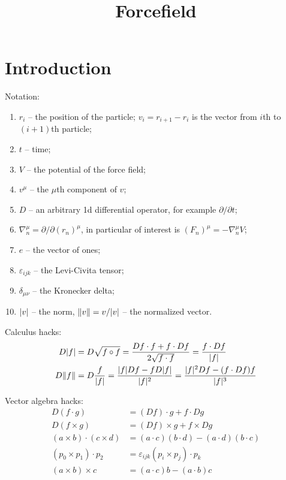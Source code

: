 \documentclass{article}
\title{Forcefield}
\author{}
\date{}
\DeclarePairedDelimiter{\norm}{\lvert}{\rvert}
\DeclarePairedDelimiter{\normed}{\lVert}{\rVert}
\newcommand{\cross}{\times}
\begin{document}
  \maketitle

  \section*{Introduction}
  Notation:
  \begin{enumerate}
    \item $r_i$ -- the position of the particle; $v_i = r_{i+1} - r_i$ is the vector from $i$th to $(i+1)$th particle;
    \item $t$ -- time;
    \item $V$ -- the potential of the force field;
    \item $v^\mu$ -- the $\mu$th component of $v$;
    \item $D$ -- an arbitrary 1d differential operator, for example $\partial/\partial t$;
    \item $\nabla_n^\mu = \partial/\partial (r_n)^\mu$, in particular of interest is $(F_n)^\mu = -\nabla_n^\mu V$;
    \item $e$ -- the vector of ones;
    \item $\varepsilon_{ijk}$ -- the Levi-Civita tensor;
    \item $\delta_{\mu\nu}$ -- the Kronecker delta;
    \item $\norm{v}$ -- the norm, $\normed{v} = v/\norm{v}$ -- the normalized vector.
  \end{enumerate}

  Calculus hacks:
  \begin{align*}
    D\norm{f} &= D\sqrt{f \circ f} = \frac{Df \cdot f + f \cdot Df}{2\sqrt{f \cdot f}} = \frac{f \cdot Df}{\norm{f}}\\
    D\normed{f} &= D\frac{f}{\norm{f}} = \frac{\norm{f}Df-f D\norm{f}}{\norm{f}^2} = \frac{\norm{f}^2 Df - (f \cdot Df)f}{\norm{f}^3}
  \end{align*}

  Vector algebra hacks:
  \begin{align*}
    D(f \cdot g) &= (Df) \cdot g + f \cdot Dg\\
    D(f \cross g) &= (Df) \cross g + f \cross Dg\\
    (a \cross b) \cdot (c \cross d) &= (a \cdot c)(b \cdot d) - (a \cdot d)(b \cdot c)\\
    (p_0 \cross p_1) \cdot p_2 &= \varepsilon_{ijk} (p_i \cross p_j) \cdot p_k\\
    (a \cross b) \cross c &= (a \cdot c)b - (a \cdot b)c
  \end{align*}
\end{document}
